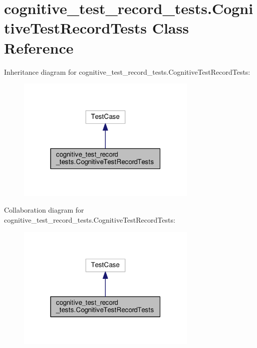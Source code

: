 \hypertarget{classcognitive__test__record__tests_1_1CognitiveTestRecordTests}{\section{cognitive\-\_\-test\-\_\-record\-\_\-tests.\-Cognitive\-Test\-Record\-Tests Class Reference}
\label{classcognitive__test__record__tests_1_1CognitiveTestRecordTests}
}


Inheritance diagram for cognitive\-\_\-test\-\_\-record\-\_\-tests.\-Cognitive\-Test\-Record\-Tests\-:
\nopagebreak
\begin{figure}[H]
\begin{center}
\leavevmode
\includegraphics[width=244pt]{classcognitive__test__record__tests_1_1CognitiveTestRecordTests__inherit__graph}
\end{center}
\end{figure}


Collaboration diagram for cognitive\-\_\-test\-\_\-record\-\_\-tests.\-Cognitive\-Test\-Record\-Tests\-:
\nopagebreak
\begin{figure}[H]
\begin{center}
\leavevmode
\includegraphics[width=244pt]{classcognitive__test__record__tests_1_1CognitiveTestRecordTests__coll__graph}
\end{center}
\end{figure}
